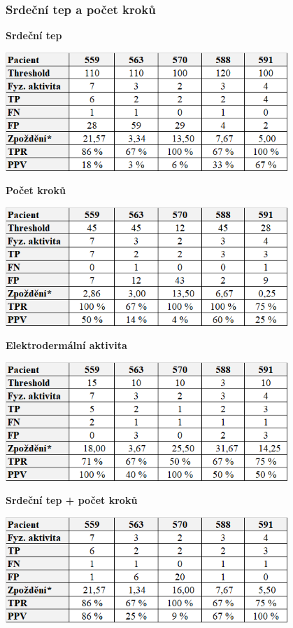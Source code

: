 \subsubsection*{Srdeční tep a počet kroků}

\begin{table}[H]
\caption{\textbf{Srdeční tep}}
\label{tab:vys:heart}
\centering
\includegraphics[width=0.8\textwidth]{img/vysledky/pa/1_heart.jpg}
\end{table}

\begin{table}[H]
\caption{\textbf{Počet kroků}}
\vspace*{1mm}
\centering
\includegraphics[width=0.8\textwidth]{img/vysledky/pa/2_steps.jpg}
\end{table}

\begin{table}[H]
\caption{\textbf{Elektrodermální aktivita}}
\vspace*{1mm}
\centering
\includegraphics[width=0.8\textwidth]{img/vysledky/pa/3_electro.jpg}
\end{table}

\begin{table}[H]
\caption{\textbf{Srdeční tep + počet kroků}}
\centering
\includegraphics[width=0.8\textwidth]{img/vysledky/pa/4_heart_steps.png}
\end{table}

